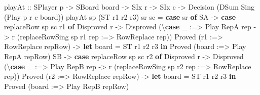 \documentclass[]{article}
\newenvironment{Shaded}{}{}
\newcommand{\DataTypeTok}[1]{\textcolor[rgb]{0.56,0.13,0.00}{#1}}
\newcommand{\KeywordTok}[1]{\textcolor[rgb]{0.00,0.44,0.13}{\textbf{#1}}}
\newcommand{\NormalTok}[1]{#1}
\newcommand{\OperatorTok}[1]{\textcolor[rgb]{0.40,0.40,0.40}{#1}}
\newcommand{\OtherTok}[1]{\textcolor[rgb]{0.00,0.44,0.13}{#1}}
\begin{document}
\begin{Shaded}
\begin{Highlighting}[]
\NormalTok{playAt}
\OtherTok{    ::} \DataTypeTok{SPlayer}\NormalTok{ p}
    \OtherTok{{-}\textgreater{}} \DataTypeTok{SBoard}\NormalTok{ board}
    \OtherTok{{-}\textgreater{}} \DataTypeTok{SIx}\NormalTok{ r}
    \OtherTok{{-}\textgreater{}} \DataTypeTok{SIx}\NormalTok{ c}
    \OtherTok{{-}\textgreater{}} \DataTypeTok{Decision}\NormalTok{ (}\DataTypeTok{DSum} \DataTypeTok{Sing}\NormalTok{ (}\DataTypeTok{Play}\NormalTok{ p r c board))}
\NormalTok{playAt sp (}\DataTypeTok{ST}\NormalTok{ r1 r2 r3) sr sc }\OtherTok{=}
    \KeywordTok{case}\NormalTok{ sr }\KeywordTok{of}
        \DataTypeTok{SA} \OtherTok{{-}\textgreater{}}
            \KeywordTok{case}\NormalTok{ replaceRow sp sc r1 }\KeywordTok{of}
                \DataTypeTok{Disproved}\NormalTok{ r }\OtherTok{{-}\textgreater{}} \DataTypeTok{Disproved}\NormalTok{ (\textbackslash{}}\KeywordTok{case}
\NormalTok{                    \_ }\OperatorTok{:=\textgreater{}} \DataTypeTok{Play} \DataTypeTok{RepA}\NormalTok{ rep }\OtherTok{{-}\textgreater{}}
\NormalTok{                        r (replaceRowSing sp r1 rep }\OperatorTok{:=\textgreater{}} \DataTypeTok{RowReplace}\NormalTok{ rep))}
                \DataTypeTok{Proved}\NormalTok{ (r1\textquotesingle{} }\OperatorTok{:=\textgreater{}} \DataTypeTok{RowReplace}\NormalTok{ repRow) }\OtherTok{{-}\textgreater{}}
                    \KeywordTok{let}\NormalTok{ board\textquotesingle{} }\OtherTok{=} \DataTypeTok{ST}\NormalTok{ r1\textquotesingle{} r2 r3}
                    \KeywordTok{in} \DataTypeTok{Proved}\NormalTok{ (board\textquotesingle{} }\OperatorTok{:=\textgreater{}} \DataTypeTok{Play} \DataTypeTok{RepA}\NormalTok{ repRow)}
        \DataTypeTok{SB} \OtherTok{{-}\textgreater{}}
            \KeywordTok{case}\NormalTok{ replaceRow sp sc r2 }\KeywordTok{of}
                \DataTypeTok{Disproved}\NormalTok{ r }\OtherTok{{-}\textgreater{}} \DataTypeTok{Disproved}\NormalTok{ (\textbackslash{}}\KeywordTok{case}
\NormalTok{                    \_ }\OperatorTok{:=\textgreater{}} \DataTypeTok{Play} \DataTypeTok{RepB}\NormalTok{ rep }\OtherTok{{-}\textgreater{}}
\NormalTok{                        r (replaceRowSing sp r2 rep }\OperatorTok{:=\textgreater{}} \DataTypeTok{RowReplace}\NormalTok{ rep))}
                \DataTypeTok{Proved}\NormalTok{ (r2\textquotesingle{} }\OperatorTok{:=\textgreater{}} \DataTypeTok{RowReplace}\NormalTok{ repRow) }\OtherTok{{-}\textgreater{}}
                    \KeywordTok{let}\NormalTok{ board\textquotesingle{} }\OtherTok{=} \DataTypeTok{ST}\NormalTok{ r1 r2\textquotesingle{} r3}
                    \KeywordTok{in} \DataTypeTok{Proved}\NormalTok{ (board\textquotesingle{} }\OperatorTok{:=\textgreater{}} \DataTypeTok{Play} \DataTypeTok{RepB}\NormalTok{ repRow)}

\end{Highlighting}
\end{Shaded}
\end{document}
